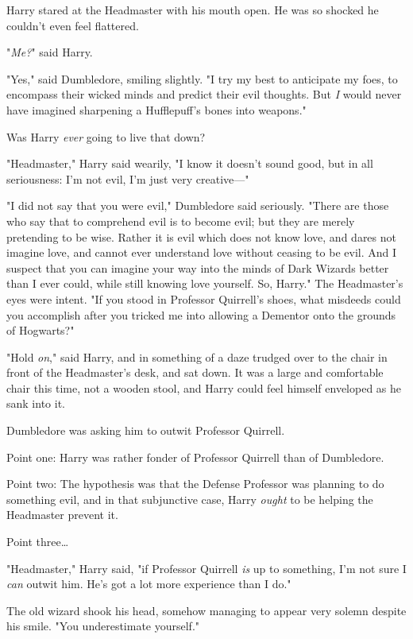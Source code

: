 Harry stared at the Headmaster with his mouth open. He was so shocked he 
couldn't even feel flattered.

"\emph{Me?}" said Harry.

"Yes," said Dumbledore, smiling slightly. "I try my best to anticipate my foes, 
to encompass their wicked minds and predict their evil thoughts. But \emph{I} 
would never have imagined sharpening a Hufflepuff's bones into weapons."

Was Harry \emph{ever} going to live that down?

"Headmaster," Harry said wearily, "I know it doesn't sound good, but in all 
seriousness: I'm not evil, I'm just very creative---"

"I did not say that you were evil," Dumbledore said seriously. "There are those 
who say that to comprehend evil is to become evil; but they are merely 
pretending to be wise. Rather it is evil which does not know love, and dares 
not imagine love, and cannot ever understand love without ceasing to be evil. 
And I suspect that you can imagine your way into the minds of Dark Wizards 
better than I ever could, while still knowing love yourself. So, Harry." The 
Headmaster's eyes were intent. "If you stood in Professor Quirrell's shoes, 
what misdeeds could you accomplish after you tricked me into allowing a 
Dementor onto the grounds of Hogwarts?"

"Hold \emph{on}," said Harry, and in something of a daze trudged over to the 
chair in front of the Headmaster's desk, and sat down. It was a large and 
comfortable chair this time, not a wooden stool, and Harry could feel himself 
enveloped as he sank into it.

Dumbledore was asking him to outwit Professor Quirrell.

Point one: Harry was rather fonder of Professor Quirrell than of Dumbledore.

Point two: The hypothesis was that the Defense Professor was planning to do 
something evil, and in that subjunctive case, Harry \emph{ought} to be helping 
the Headmaster prevent it.

Point three{\ldots}

"Headmaster," Harry said, "if Professor Quirrell \emph{is} up to something, I'm 
not sure I \emph{can} outwit him. He's got a lot more experience than I do."

The old wizard shook his head, somehow managing to appear very solemn despite 
his smile. "You underestimate yourself."

